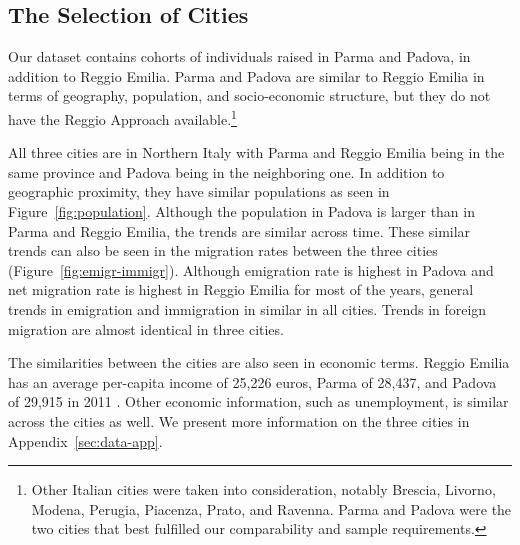 \subsection{The Selection of Cities}

Our dataset contains cohorts of individuals raised in Parma and Padova, in addition to Reggio Emilia. Parma and Padova are similar to Reggio Emilia in terms of geography, population, and socio-economic structure, but they do not have the Reggio Approach available.\footnote{Other Italian cities were taken into consideration, notably Brescia, Livorno, Modena, Perugia, Piacenza, Prato, and Ravenna. Parma and Padova were the two cities that best fulfilled our comparability and sample requirements.} 

All three cities are in Northern Italy with Parma and Reggio Emilia being in the same province and Padova being in the neighboring one. In addition to geographic proximity, they have similar populations as seen in Figure~\ref{fig:population}. Although the population in Padova is larger than in Parma and Reggio Emilia, the trends are similar across time. These similar trends can also be seen in the migration rates between the three cities (Figure~\ref{fig:emigr-immigr}). Although emigration rate is highest in Padova and net migration rate is highest in Reggio Emilia for most of the years, general trends in emigration and immigration in similar in all cities. Trends in foreign migration are almost identical in three cities. 

The similarities between the cities are also seen in economic terms. Reggio Emilia has an average per-capita income of 25,226 euros, Parma of 28,437, and Padova of 29,915 in 2011 \citep{Comuni-Italiani_2017_Redditi-Ipref-per-Regione-2011}. Other economic information, such as unemployment, is similar across the cities as well. We present more information on the three cities in Appendix~\ref{sec:data-app}. 

